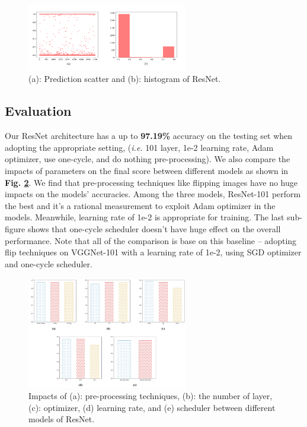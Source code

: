 \documentclass[10pt,twocolumn,letterpaper]{article}
\begin{document}
\begin{figure}[h]
\centering
\includegraphics[width=7cm]{res_best.pdf}
\caption{(a): Prediction scatter and (b): histogram of \textsf{ResNet}.}
\label{resresults}
\end{figure}


\subsection{Evaluation}
Our \textsf{ResNet} architecture has a up to \textbf{97.19\%} accuracy on the testing set when adopting the appropriate setting, (\textit{i.e.} 101 layer, 1e-2 learning rate, Adam optimizer, use one-cycle, and do nothing pre-processing). We also compare the impacts of parameters on the final score between different models as shown in \textbf{Fig. \ref{rescompare}}. We find that pre-processing techniques like flipping images have no huge impacts on the models' accuracies. Among the three models, \textsf{ResNet-101} perform the best and it's a rational measurement to exploit Adam optimizer in the models. Meanwhile, learning rate of 1e-2 is appropriate for training. The last sub-figure shows that one-cycle scheduler doesn't have huge effect on the overall performance. Note that all of the comparison is base on this baseline -- adopting flip techniques on \textsf{VGGNet-101} with a learning rate of 1e-2, using SGD optimizer and one-cycle scheduler.

\begin{figure}[h]
\centering
\includegraphics[width=7cm]{res.pdf}
\caption{Impacts of (a): pre-processing techniques, (b): the number of layer, (c): optimizer, (d) learning rate, and (e) scheduler between different models of \textsf{ResNet}.}
\label{rescompare}
\end{figure}
\end{document}
